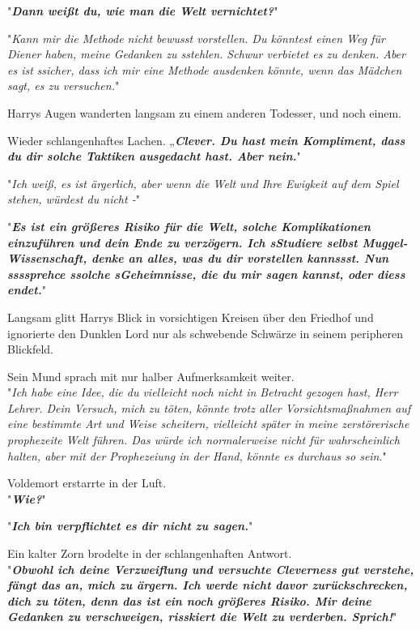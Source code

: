 {"\textbf{\emph{Dann weißt du, wie man die Welt vernichtet?}}"

"\emph{Kann mir die Methode nicht bewusst vorstellen. Du könntest einen Weg für Diener haben, meine Gedanken zu sstehlen. Schwur verbietet es zu denken. Aber es ist} \emph{ssicher, dass ich mir eine Methode ausdenken könnte, wenn das Mädchen sagt, es zu versuchen.}"

Harrys Augen wanderten langsam zu einem anderen Todesser, und noch einem.

Wieder schlangenhaftes Lachen. „\textbf{\emph{Clever. Du hast mein Kompliment, dass du dir solche Taktiken ausgedacht hast. Aber nein.}}"

"\emph{Ich weiß, es ist ärgerlich, aber wenn die Welt und Ihre Ewigkeit auf dem Spiel stehen, würdest du nicht -}"

"\textbf{\emph{Es ist ein größeres Risiko für die Welt, solche Komplikationen einzuführen und dein Ende zu verzögern. Ich sStudiere selbst Muggel-Wissenschaft, denke an alles, was du dir vorstellen kannssst. Nun ssssprehce ssolche sGeheimnisse, die du mir sagen kannst, oder diess endet.}}"

Langsam glitt Harrys Blick in vorsichtigen Kreisen über den Friedhof und ignorierte den Dunklen Lord nur als schwebende Schwärze in seinem peripheren Blickfeld.

Sein Mund sprach mit nur halber Aufmerksamkeit weiter.\\ "\emph{Ich habe eine Idee, die du vielleicht noch nicht in Betracht gezogen hast, Herr Lehrer. Dein Versuch, mich zu töten, könnte trotz aller Vorsichtsmaßnahmen auf eine bestimmte Art und Weise scheitern, vielleicht später in meine zerstörerische prophezeite Welt führen. Das würde ich normalerweise nicht für wahrscheinlich halten, aber mit der Prophezeiung in der Hand, könnte es durchaus so sein}."

Voldemort erstarrte in der Luft.\\ "\textbf{\emph{Wie?}}"

"\textbf{\emph{Ich bin verpflichtet es dir nicht zu sagen.}}"

Ein kalter Zorn brodelte in der schlangenhaften Antwort.\\ "\textbf{\emph{Obwohl ich deine Verzweiflung und versuchte Cleverness gut verstehe, fängt das an, mich zu ärgern. Ich werde nicht davor zurückschrecken, dich zu töten, denn das ist ein noch größeres Risiko. Mir deine Gedanken zu verschweigen, risskiert die Welt zu verderben. Sprich!}}"

}
